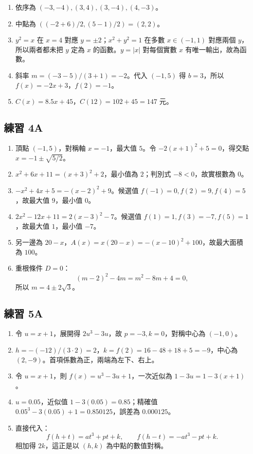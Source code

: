 \documentclass[11pt,a4paper]{article}
\providecommand{\tightlist}{%
  \setlength{\itemsep}{0pt}\setlength{\parskip}{0pt}}
\begin{document}
\begin{enumerate}
\def\labelenumi{\arabic{enumi}.}
\tightlist
\item
  依序為 \(\boxed{(-3,-4),(3,4),(3,-4),(4,-3)}\)。
\item
  中點為 \(\left((-2+6)/2,(5-1)/2\right)=\boxed{(2,2)}\)。
\item
  \(y^2=x\) 在 \(x=4\) 對應 \(y=\pm2\)；\(x^2+y^2=1\) 在多數 \(x\in(-1,1)\) 對應兩個 \(y\)，所以兩者都未把 \(y\) 定為 \(x\) 的函數。\(y=|x|\) 對每個實數 \(x\) 有唯一輸出，故為函數。
\item
  斜率 \(m=(-3-5)/(3+1)=-2\)。代入 \((-1,5)\) 得 \(b=3\)，所以 \(f(x)=\boxed{-2x+3}\)，\(f(2)=\boxed{-1}\)。
\item
  \(C(x)=\boxed{8.5x+45}\)，\(C(12)=102+45=\boxed{147}\) 元。
\end{enumerate}

\subsection{練習 4A}\label{ux7df4ux7fd2-4a-1}

\begin{enumerate}
\def\labelenumi{\arabic{enumi}.}
\tightlist
\item
  頂點 \((-1,5)\)，對稱軸 \(x=-1\)，最大值 \(5\)。令 \(-2(x+1)^2+5=0\)，得交點 \(x=\boxed{-1\pm\sqrt{5/2}}\)。
\item
  \(x^2+6x+11=(x+3)^2+2\)，最小值為 \(\boxed2\)；判別式 \(-8<0\)，故實根數為 \(0\)。
\item
  \(-x^2+4x+5=-(x-2)^2+9\)。候選值 \(f(-1)=0,f(2)=9,f(4)=5\)，故最大值 \(\boxed9\)，最小值 \(\boxed0\)。
\item
  \(2x^2-12x+11=2(x-3)^2-7\)。候選值 \(f(1)=1,f(3)=-7,f(5)=1\)，故最大值 \(\boxed1\)，最小值 \(\boxed{-7}\)。
\item
  另一邊為 \(20-x\)，\(A(x)=x(20-x)=-(x-10)^2+100\)，故最大面積為 \(\boxed{100}\)。
\item
  重根條件 \(D=0\)：
  \[(m-2)^2-4m=m^2-8m+4=0,\]
  所以 \(\boxed{m=4\pm2\sqrt3}\)。
\end{enumerate}

\subsection{練習 5A}\label{ux7df4ux7fd2-5a-1}

\begin{enumerate}
\def\labelenumi{\arabic{enumi}.}
\tightlist
\item
  令 \(u=x+1\)，展開得 \(2u^3-3u\)，故 \(p=-3,k=0\)，對稱中心為 \(\boxed{(-1,0)}\)。
\item
  \(h=-(-12)/(3\cdot2)=2\)，\(k=f(2)=16-48+18+5=-9\)，中心為 \(\boxed{(2,-9)}\)。首項係數為正，兩端為左下、右上。
\item
  令 \(u=x+1\)，則 \(f(x)=u^3-3u+1\)，一次近似為 \(\boxed{1-3u=1-3(x+1)}\)。
\item
  \(u=0.05\)，近似值 \(1-3(0.05)=0.85\)；精確值 \(0.05^3-3(0.05)+1=0.850125\)，誤差為 \(\boxed{0.000125}\)。
\item
  直接代入：
  \[f(h+t)=at^3+pt+k,\qquad f(h-t)=-at^3-pt+k.\]
  相加得 \(\boxed{2k}\)，這正是以 \((h,k)\) 為中點的數值對稱。
\end{enumerate}
\end{document}
